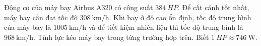 \begin{ex}
	Động cơ của máy bay Airbus A320 có công suất $\SI{384}{HP}$. Để cất cánh tốt nhất, máy bay cần đạt tốc độ $\SI{308}{\kilo\meter/\hour}$. Khi bay ở độ cao ổn định, tốc độ trung bình của máy bay là $\SI{1005}{\kilo\meter/\hour}$ và để tiết kiệm nhiên liệu thì tốc độ trung bình là $\SI{968}{\kilo\meter/\hour}$. Tính lực kéo máy bay trong từng trường hợp trên. Biết $\SI{1}{HP} \approx \SI{746}{\watt}$.
\end{ex}
